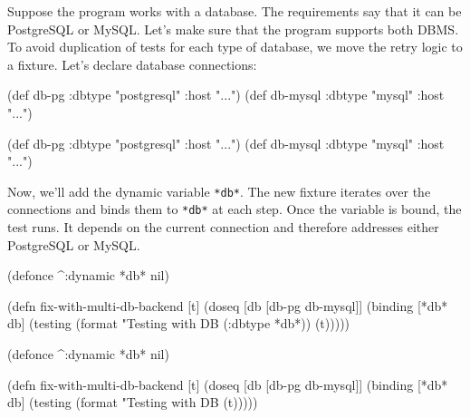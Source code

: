 Suppose the program works with a database. The requirements say that it can be PostgreSQL or MySQL. Let's make sure that the program supports both DBMS. To avoid duplication of tests for each type of database, we move the retry logic to a fixture. Let's declare database connections:

\ifnarrow

\begin{english}
  \begin{clojure}
(def db-pg
  {:dbtype "postgresql" :host "..."})
(def db-mysql
  {:dbtype "mysql"      :host "..."})
  \end{clojure}
\end{english}

\else

\begin{english}
  \begin{clojure}
(def db-pg    {:dbtype "postgresql" :host "..."})
(def db-mysql {:dbtype "mysql"      :host "..."})
  \end{clojure}
\end{english}

\fi

Now, we'll add the dynamic variable \verb|*db*|. The new fixture iterates over the connections and binds them to \verb|*db*| at each step. Once the variable is bound, the test runs. It depends on the current connection and therefore addresses either PostgreSQL or MySQL.

\ifnarrow

\begin{english}
  \begin{clojure}
(defonce ^:dynamic *db* nil)

(defn fix-with-multi-db-backend [t]
  (doseq [db [db-pg db-mysql]]
    (binding [*db* db]
      (testing
        (format "Testing with DB %
          (:dbtype *db*))
        (t)))))
  \end{clojure}
\end{english}

\else

\begin{english}
  \begin{clojure}
(defonce ^:dynamic *db* nil)

(defn fix-with-multi-db-backend [t]
  (doseq [db [db-pg db-mysql]]
    (binding [*db* db]
      (testing (format "Testing with DB %
        (t)))))
  \end{clojure}
\end{english}

